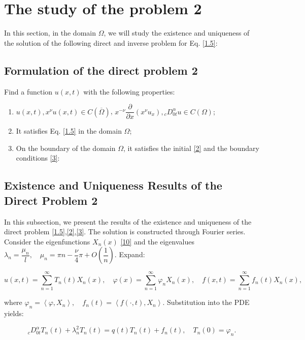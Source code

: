 \documentclass[reqno]{amsart}
\theoremstyle{definition}
\numberwithin{equation}{section}
\begin{document}
\section{The study of the problem 2}

In this section, in the domain $\Omega$, we will study the existence and uniqueness of the solution
of the following direct and inverse problem for Eq. \eqref{1.5}:

\subsection{ Formulation of the direct problem 2}

Find a function $ u(x, t)$ with the following properties:

\begin{enumerate}
    \item $u(x,t), x^{\nu}u(x,t)\in C(\overline{\Omega})$, $x^{-\nu}\dfrac{\partial}{\partial x}\left(x^{\nu}u_x\right), {_c}D_{0t}^{\alpha}u \in C(\Omega);$
    \item It satisfies Eq. \eqref{1.5} in the domain $\Omega$;
    \item On the boundary of the domain $\Omega$, it satisfies the initial \eqref{2} and the boundary conditions \eqref{3}:
\end{enumerate}
\subsection{Existence and Uniqueness Results of the Direct Problem 2}
In this subsection, we
present the results of the existence and uniqueness of the direct
problem \eqref{1.5},\eqref{2},\eqref{3}.
The solution is constructed through Fourier series. Consider the eigenfunctions $X_n(x)$ \eqref{10} and the eigenvalues $\lambda_n=\dfrac{\mu_n}{l},\quad \mu_n=\pi n-\dfrac{\nu}{4}\pi+O(\dfrac{1}{n})$.
Expand:

$$
u(x, t)=\sum_{n=1}^{\infty} T_n(t) X_n(x), \quad \varphi(x)=\sum_{n=1}^{\infty} \varphi_n X_n(x), \quad f(x, t)=\sum_{n=1}^{\infty} f_n(t) X_n(x),
$$

where $\varphi_n=\left\langle\varphi, X_n\right\rangle,\quad f_n(t)=\left\langle f(\cdot, t), X_n\right\rangle$. Substitution into the PDE yields:

\begin{equation}\label{T(t)eq}
    _cD_{0t}^\alpha T_n(t)+\lambda_n^2T_n(t)=q(t)T_n(t)+f_n(t), \quad T_n(0)=\varphi_n.
\end{equation}
\end{document}
